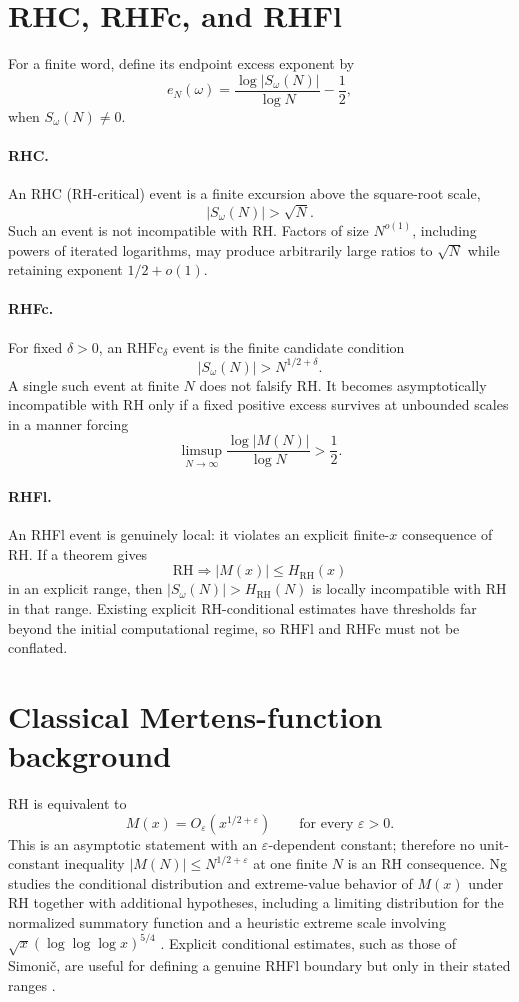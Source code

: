 \documentclass[11pt]{article}
\newcommand{\RHFc}{\mathrm{RHFc}}
\begin{document}
\section{RHC, RHFc, and RHFl}
For a finite word, define its endpoint excess exponent by
\[
 e_N(\omega)=\frac{\log|S_\omega(N)|}{\log N}-\frac12,
\]
when $S_\omega(N)\ne0$.

\paragraph{RHC.}
An RHC (RH-critical) event is a finite excursion above the square-root scale,
\[
 |S_\omega(N)|>\sqrt N.
\]
Such an event is not incompatible with RH.  Factors of size $N^{o(1)}$, including powers of iterated logarithms, may produce arbitrarily large ratios to $\sqrt N$ while retaining exponent $1/2+o(1)$.

\paragraph{RHFc.}
For fixed $\delta>0$, an $\RHFc_\delta$ event is the finite candidate condition
\[
 |S_\omega(N)|>N^{1/2+\delta}.
\]
A single such event at finite $N$ does not falsify RH.  It becomes asymptotically incompatible with RH only if a fixed positive excess survives at unbounded scales in a manner forcing
\[
 \limsup_{N\to\infty}\frac{\log|M(N)|}{\log N}>\frac12.
\]

\paragraph{RHFl.}
An RHFl event is genuinely local: it violates an explicit finite-$x$ consequence of RH.  If a theorem gives
\[
 \mathrm{RH}\Longrightarrow |M(x)|\le H_{\mathrm{RH}}(x)
\]
in an explicit range, then $|S_\omega(N)|>H_{\mathrm{RH}}(N)$ is locally incompatible with RH in that range.  Existing explicit RH-conditional estimates have thresholds far beyond the initial computational regime, so RHFl and RHFc must not be conflated.

\section{Classical Mertens-function background}
RH is equivalent to
\[
 M(x)=O_\varepsilon(x^{1/2+\varepsilon})
 \qquad\text{for every }\varepsilon>0.
\]
This is an asymptotic statement with an $\varepsilon$-dependent constant; therefore no unit-constant inequality $|M(N)|\le N^{1/2+\varepsilon}$ at one finite $N$ is an RH consequence.  Ng studies the conditional distribution and extreme-value behavior of $M(x)$ under RH together with additional hypotheses, including a limiting distribution for the normalized summatory function and a heuristic extreme scale involving $\sqrt{x}(\log\log\log x)^{5/4}$ \cite{Ng2004}.  Explicit conditional estimates, such as those of Simonič, are useful for defining a genuine RHFl boundary but only in their stated ranges \cite{Simonic2022}.
\end{document}
